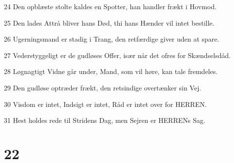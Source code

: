 \par 24 Den opblæste stolte kaldes en Spotter, han handler frækt i Hovmod.
\par 25 Den lades Attrå bliver hans Død, thi hans Hænder vil intet bestille.
\par 26 Ugerningsmand er stadig i Trang, den retfærdige giver uden at spare.
\par 27 Vederstyggeligt er de gudløses Offer, især når det ofres for Skændselsdåd.
\par 28 Løgnagtigt Vidne går under, Mand, som vil høre, kan tale fremdeles.
\par 29 Den gudløse optræder frækt, den retsindige overtænker sin Vej.
\par 30 Visdom er intet, Indsigt er intet, Råd er intet over for HERREN.
\par 31 Hest holdes rede til Stridens Dag, men Sejren er HERRENs Sag.

\chapter{22}

